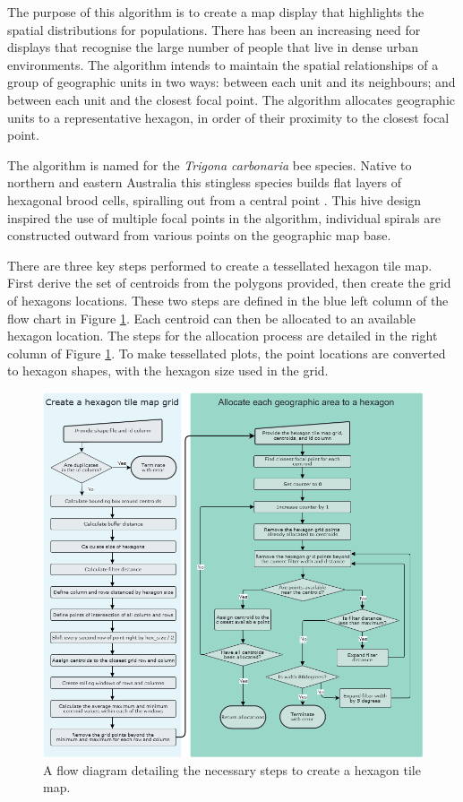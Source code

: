 The purpose of this algorithm is to create a map display that highlights
the spatial distributions for populations. There has been an increasing
need for displays that recognise the large number of people that live in
dense urban environments. The algorithm intends to maintain the spatial
relationships of a group of geographic units in two ways: between each
unit and its neighbours; and between each unit and the closest focal
point. The algorithm allocates geographic units to a representative
hexagon, in order of their proximity to the closest focal point.

The algorithm is named for the \emph{Trigona carbonaria} bee species.
Native to northern and eastern Australia this stingless species builds
flat layers of hexagonal brood cells, spiralling out from a central
point \citep{PH}. This hive design inspired the use of multiple focal
points in the algorithm, individual spirals are constructed outward from
various points on the geographic map base.

There are three key steps performed to create a tessellated hexagon tile
map. First derive the set of centroids from the polygons provided, then
create the grid of hexagons locations. These two steps are defined in
the blue left column of the flow chart in Figure
\ref{fig:sugarbag_flow}. Each centroid can then be allocated to an
available hexagon location. The steps for the allocation process are
detailed in the right column of Figure \ref{fig:sugarbag_flow}. To make
tessellated plots, the point locations are converted to hexagon shapes,
with the hexagon size used in the grid.

\begin{figure}
\includegraphics[width=14cm]{figs/sugarbag flow.png}
\caption{\label{fig:sugarbag_flow}A flow diagram detailing the necessary steps to create a hexagon tile map.}
\end{figure}

